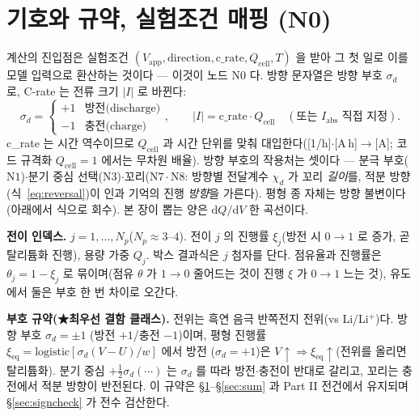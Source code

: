 \documentclass[11pt,a4paper]{article}
\newcommand{\dd}{\mathrm{d}}
\newcommand{\eq}{\mathrm{eq}}
\newcommand{\app}{\mathrm{app}}
\newcommand{\cell}{\mathrm{cell}}
\begin{document}
\tableofcontents
\newpage

\section{기호와 규약, 실험조건 매핑 (N0)}\label{sec:notation}
계산의 진입점은 실험조건 $(V_\app,\text{direction},\text{c\_rate},Q_\cell,T)$ 을 받아 그 첫 일로 이를 모델
입력으로 환산하는 것이다 — 이것이 노드 $\mathrm N0$ 다. 방향 문자열은 방향 부호 $\sigma_d$ 로,
C-rate 는 전류 크기 $|I|$ 로 바뀐다:
\begin{equation}
\sigma_d=\begin{cases}+1 & \text{방전(discharge)}\\ -1 & \text{충전(charge)}\end{cases},
\qquad
|I|=\text{c\_rate}\cdot Q_\cell\quad(\text{또는 }I_\mathrm{abs}\text{ 직접 지정}).
\label{eq:n0map}
\end{equation}
c\_rate 는 시간 역수이므로 $Q_\cell$ 과 시간 단위를 맞춰 대입한다([1/h]$\cdot$[A\,h]$\to$[A]; 코드 규격화
$Q_\cell{=}1$ 에서는 무차원 배율). 방향 부호의 작용처는 셋이다 — 분극 부호($\mathrm N1$)$\cdot$분기 중심 선택($\mathrm N3$)$\cdot$꼬리($\mathrm N7\cdot\mathrm N8$:
방향별 전달계수 $\chi_d$ 가 꼬리 \emph{길이}를, 적분 방향(식~\eqref{eq:reversal})이 인과 기억의 진행 \emph{방향}을 가른다).
평형 종 자체는 방향 불변이다(아래에서 식으로 회수). 본 장이 뽑는 양은 $\dd Q/\dd V$ 한 곡선이다.

\textbf{전이 인덱스.} $j=1,\dots,N_p$($N_p\approx3$--$4$). 전이 $j$ 의 진행률 $\xi_j$(방전 시 $0\to1$ 로 증가, 곧 탈리튬화 진행),
용량 가중 $Q_j$. 박스 결과식은 $j$ 첨자를 단다. 점유율과 진행률은 $\theta_j=1-\xi_j$ 로 묶이며(점유 $\theta$ 가 $1\to0$
줄어드는 것이 진행 $\xi$ 가 $0\to1$ 느는 것), 유도에서 둘은 부호 한 번 차이로 오간다.

\textbf{부호 규약(★최우선 결함 클래스).} 전위는 흑연 음극 반쪽전지 전위(vs Li/Li$^+$)다. 방향 부호 $\sigma_d=\pm1$
(방전 $+1$/충전 $-1$)이며, 평형 진행률 $\xi_\eq=\mathrm{logistic}[\sigma_d(V-U)/w]$ 에서 방전
($\sigma_d=+1$)은 $V\!\uparrow\Rightarrow\xi_\eq\!\uparrow$(전위를 올리면 탈리튬화). 분기 중심 $+\tfrac12\sigma_d(\cdots)$
는 $\sigma_d$ 를 따라 방전$\cdot$충전이 반대로 갈리고, 꼬리는 충전에서 적분 방향이 반전된다. 이 규약은 \S\ref{sec:notation}--\S\ref{sec:sum}
과 Part II 전건에서 유지되며 \S\ref{sec:signcheck} 가 전수 검산한다.
\end{document}
